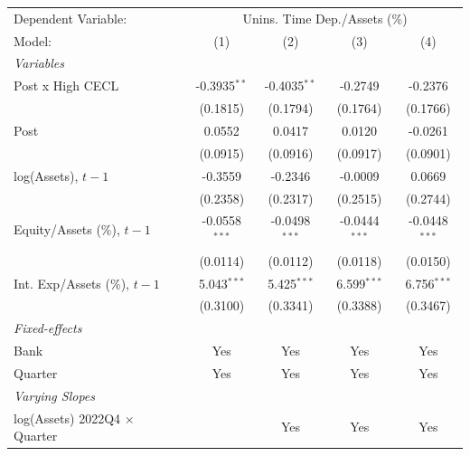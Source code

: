
\begingroup
\centering
\begin{tabular}{lcccc}
   \tabularnewline \midrule \midrule
   Dependent Variable: & \multicolumn{4}{c}{Unins. Time Dep./Assets (\%)}\\
   Model:                                  & (1)             & (2)             & (3)             & (4)\\  
   \midrule
   \emph{Variables}\\
   Post x High CECL                        & -0.3935$^{**}$  & -0.4035$^{**}$  & -0.2749         & -0.2376\\   
                                           & (0.1815)        & (0.1794)        & (0.1764)        & (0.1766)\\   
   Post                                    & 0.0552          & 0.0417          & 0.0120          & -0.0261\\   
                                           & (0.0915)        & (0.0916)        & (0.0917)        & (0.0901)\\   
   log(Assets), $t{-}1$                    & -0.3559         & -0.2346         & -0.0009         & 0.0669\\   
                                           & (0.2358)        & (0.2317)        & (0.2515)        & (0.2744)\\   
   Equity/Assets (\%), $t{-}1$             & -0.0558$^{***}$ & -0.0498$^{***}$ & -0.0444$^{***}$ & -0.0448$^{***}$\\   
                                           & (0.0114)        & (0.0112)        & (0.0118)        & (0.0150)\\   
   Int. Exp/Assets (\%), $t{-}1$           & 5.043$^{***}$   & 5.425$^{***}$   & 6.599$^{***}$   & 6.756$^{***}$\\   
                                           & (0.3100)        & (0.3341)        & (0.3388)        & (0.3467)\\   
   \midrule
   \emph{Fixed-effects}\\
   Bank                                    & Yes             & Yes             & Yes             & Yes\\  
   Quarter                                 & Yes             & Yes             & Yes             & Yes\\  
   \midrule
   \emph{Varying Slopes}\\
   log(Assets) 2022Q4 $\times$ Quarter                 &                 & Yes             & Yes             & Yes\\  

\end{tabular}
